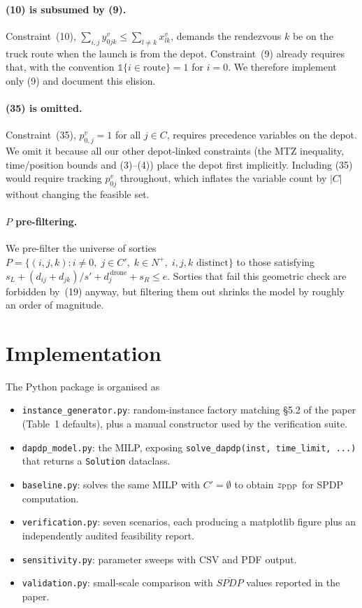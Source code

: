 \documentclass[11pt,a4paper]{article}
\newcommand{\Nplus}{N^{+}}
\newcommand{\Cprime}{C'}
\newcommand{\pdp}{\textsc{PDP}}
\begin{document}
\paragraph{(10) is subsumed by (9).}
Constraint~(10), $\sum_{i,j} y^{v}_{0jk} \le \sum_{l\ne k} x^{v}_{lk}$,
demands the rendezvous $k$ be on the truck route when the launch is from
the depot. Constraint~(9) already requires that, with the convention
$\mathbb{1}\{i\in\text{route}\}=1$ for $i=0$. We therefore implement only
(9) and document this elision.

\paragraph{(35) is omitted.}
Constraint~(35), $p^{v}_{0,j}=1$ for all $j\in C$, requires precedence
variables on the depot. We omit it because all our other depot-linked
constraints (the MTZ inequality, time/position bounds and (3)--(4)) place
the depot first implicitly. Including (35) would require tracking
$p^{v}_{0j}$ throughout, which inflates the variable count by $|C|$
without changing the feasible set.

\paragraph{$P$ pre-filtering.}
We pre-filter the universe of sorties $P = \{(i,j,k): i\ne 0,\;j \in
\Cprime,\;k\in\Nplus,\;i,j,k\text{ distinct}\}$ to those satisfying
$s_L + (d_{ij}+d_{jk})/s' + d^{\,\text{drone}}_{j} + s_R \le e$. Sorties
that fail this geometric check are forbidden by~(19) anyway, but
filtering them out shrinks the model by roughly an order of magnitude.

\section{Implementation}

The Python package is organised as
\begin{itemize}
\item \texttt{instance\_generator.py}: random-instance factory matching
\S5.2 of the paper (Table~1 defaults), plus a manual constructor used by
the verification suite.
\item \texttt{dapdp\_model.py}: the MILP, exposing
\texttt{solve\_dapdp(inst, time\_limit, ...)} that returns a
\texttt{Solution} dataclass.
\item \texttt{baseline.py}: solves the same MILP with $\Cprime=\emptyset$
to obtain $z_{\pdp}$ for SPDP computation.
\item \texttt{verification.py}: seven scenarios, each producing a
matplotlib figure plus an independently audited feasibility report.
\item \texttt{sensitivity.py}: parameter sweeps with CSV and PDF output.
\item \texttt{validation.py}: small-scale comparison with
$\overline{\mathit{SPDP}}$ values reported in the paper.
\end{itemize}
\end{document}
